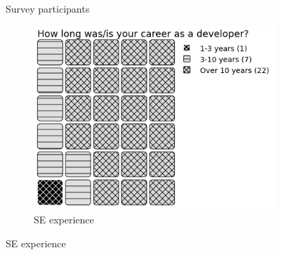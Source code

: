 \begin{figure}
    \centering
    \caption{Survey participants}
    \label{fig:Survey_participants}
    \caption{Survey locations}
    \label{fig:Survey_locations}
    \begin{subfigure}{.33\textwidth}
      \centering
      \includegraphics[width=.95\linewidth]{Sections/images/pie_experiencer4.png}
      \caption{SE experience}
      \label{fig:sfig1}
    \end{subfigure}%

\end{figure}
